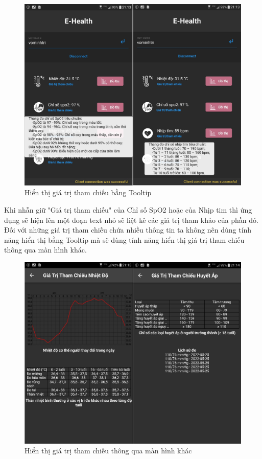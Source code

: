 \documentclass{report}
\begin{document}
\begin{figure}[h]
	\centering
	\includegraphics[scale = 0.4]{fig59.png}
	\caption{Hiển thị giá trị tham chiếu bằng Tooltip}
	\label{fig:Graph59}
\end{figure}

Khi nhẫn giữ "Giá trị tham chiếu" của Chỉ số SpO2 hoặc của Nhịp tim thì ứng dụng sẽ hiện lên một đoạn text nhỏ sẽ liệt kê các giá trị tham khảo của phần đó. 
\newpage
Đối với những giá trị tham chiếu chứa nhiều thông tin ta không nên dùng tính năng hiển thị bằng Tooltip mà sẽ dùng tính năng hiển thị giá trị tham chiếu thông qua màn hình khác.

\begin{figure}[h]
	\centering
	\includegraphics[scale = 0.4]{fig60.png}
	\caption{Hiển thị giá trị tham chiếu thông qua màn hình khác}
	\label{fig:Graph60}
\end{figure}
\end{document}
